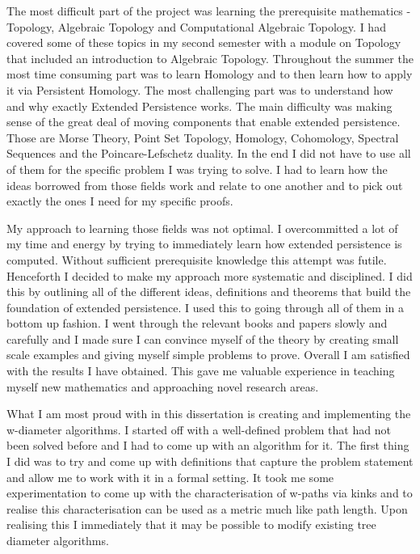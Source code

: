 The most difficult part of the project was learning the prerequisite mathematics - Topology, Algebraic Topology and Computational Algebraic Topology. I had covered some of these topics in my second semester with a module on Topology that included an introduction to Algebraic Topology. Throughout the summer the most time consuming part was to learn Homology and to then learn how to apply it via Persistent Homology. The most challenging part was to understand how and why exactly Extended Persistence works. The main difficulty was making sense of the great deal of moving components that enable extended persistence. Those are Morse Theory, Point Set Topology, Homology, Cohomology, Spectral Sequences and the Poincare-Lefschetz duality. In the end I did not have to use all of them for the specific problem I was trying to solve. I had to learn how the ideas borrowed from those fields work and relate to one another and to pick out exactly the ones I need for my specific proofs.

My approach to learning those fields was not optimal. I overcommitted a lot of my time and energy by trying to immediately learn how extended persistence is computed. Without sufficient prerequisite knowledge this attempt was futile. Henceforth I decided to make my approach more systematic and disciplined. I did this by outlining all of the different ideas, definitions and theorems that build the foundation of extended persistence. I used this to going through all of them in a bottom up fashion. I went through the relevant books and papers slowly and carefully and I made sure I can convince myself of the theory by creating small scale examples and giving myself simple problems to prove. Overall I am satisfied with the results I have obtained. This gave me valuable experience in teaching myself new mathematics and approaching novel research areas.

What I am most proud with in this dissertation is creating and implementing the w-diameter algorithms. I started off with a well-defined problem that had not been solved before and I had to come up with an algorithm for it. The first thing I did was to try and come up with definitions that capture the problem statement and allow me to work with it in a formal setting. It took me some experimentation to come up with the characterisation of w-paths via kinks and to realise this characterisation can be used as a metric much like path length. Upon realising this I immediately that it may be possible to modify existing tree diameter algorithms.

